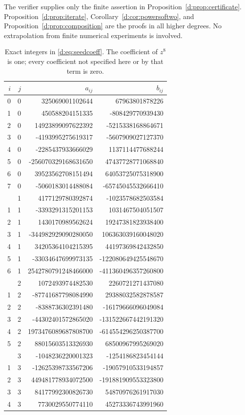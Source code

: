 \documentclass[UTF8,11pt]{ctexart}
\theoremstyle{definition}
\numberwithin{equation}{section}
\begin{document}
The verifier supplies only the finite assertion in
Proposition~\ref{d:prop:certificate}. Proposition~\ref{d:prop:iterate},
Corollary~\ref{d:cor:powersoftwo}, and
Proposition~\ref{d:prop:composition} are the proofs in all higher degrees.
No extrapolation from finite numerical experiments is involved.

\begin{table}[H]
\centering
\caption{Exact integers in \eqref{d:eq:seedcoeff}. The coefficient of $z^8$ is
one; every coefficient not specified here or by that term is zero.}
\label{d:tab:seed}
\small
\setlength{\tabcolsep}{8pt}
\begin{tabular}{rr@{\qquad}rr}
\toprule
$i$ & $j$ & $a_{ij}$ & $b_{ij}$\\
\midrule
0 & 0 & 325069001102644 & 67963801878226 \\
1 & 0 & 450588204151335 & -808429770939430 \\
2 & 0 & 14923899097622392 & -5215338168864671 \\
3 & 0 & -4193995275619317 & -5607909027127370 \\
4 & 0 & -2285437933666029 & 1137114477688244 \\
5 & 0 & -256070329168631650 & 47437728771068840 \\
6 & 0 & 39523562708151494 & 64053725075318900 \\
7 & 0 & -5060183014488084 & -65745045532666410 \\
\addlinespace[3pt]
0 & 1 & 4177129780392874 & -1023578682503584 \\
1 & 1 & -3393291315201153 & 1031467504051507 \\
2 & 1 & 1430170989562624 & 19247381823938400 \\
3 & 1 & -344982929090280050 & 106363039160048020 \\
4 & 1 & 34205364104215395 & 44197369842432850 \\
5 & 1 & -33034647699973135 & -122080649425548670 \\
6 & 1 & 2542780791248466000 & -411360496357260800 \\
\addlinespace[3pt]
0 & 2 & 1072493974482530 & 2260721271437080 \\
1 & 2 & -87741687798084990 & 29388032582878587 \\
2 & 2 & -8388736302391480 & -16179666096049084 \\
3 & 2 & -44302401572865020 & -131522667442191320 \\
4 & 2 & 1973476089687808700 & -614554296250387700 \\
5 & 2 & 88015603513326930 & 68500967995269020 \\
\addlinespace[3pt]
0 & 3 & -1048236220001323 & -1254186823454144 \\
1 & 3 & -12625398733567206 & -19057910533194857 \\
2 & 3 & 449481778934072500 & -191881909553323800 \\
3 & 3 & 84177992300826730 & 54870976261917030 \\
4 & 3 & 7730029550774110 & 45273336743991960 \\
\bottomrule
\end{tabular}
\end{table}
\end{document}
